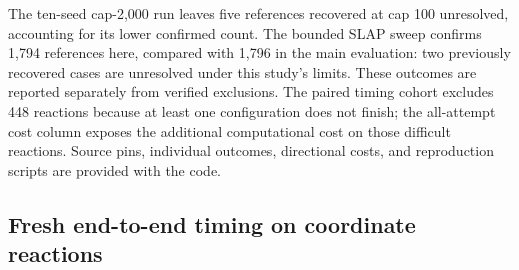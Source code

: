 The ten-seed cap-2,000 run leaves five references recovered at cap 100 unresolved, accounting for its lower confirmed count. The bounded SLAP sweep confirms 1,794 references here, compared with 1,796 in the main evaluation: two previously recovered cases are unresolved under this study's limits. These outcomes are reported separately from verified exclusions. The paired timing cohort excludes 448 reactions because at least one configuration does not finish; the all-attempt cost column exposes the additional computational cost on those difficult reactions. Source pins, individual outcomes, directional costs, and reproduction scripts are provided with the code.


\clearpage
\subsection{Fresh end-to-end timing on coordinate reactions}



\begin{table}[htbp]
\centering
\caption{\textbf{MAPA search plus bond-event decoding.} CPU seconds per completed reaction in the fresh 140-reaction pass. The final row measures the whole pipeline; medians and percentiles of individual stages are not additive. Completion coverage and timing scope are stated above.}
\label{tab:end-to-end}

\end{table}
